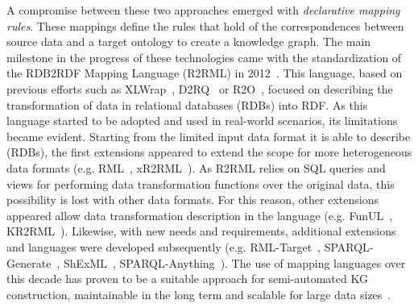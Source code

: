 A compromise between these two approaches emerged with \textit{declarative mapping rules}. 
These mappings define the rules that hold of the correspondences between source data and a target ontology to create a knowledge graph. 
The main milestone in the progress of these technologies came with the standardization of the RDB2RDF Mapping Language (R2RML) in 2012~\parencite{das2012r2rml}. 
This language, based on previous efforts such as XLWrap~\parencite{xlwrap}, D2RQ~\parencite{bizer2004d2rq} or R2O~\parencite{barrasa2004r2o}, focused on describing the transformation of data in relational databases (RDBs) into RDF. 
As this language started to be adopted and used in real-world scenarios, its limitations became evident. 
Starting from the limited input data format it is able to describe (RDBs), the first extensions appeared to extend the scope for more heterogeneous data formats (e.g. RML~\parencite{Dimou2014rml}, xR2RML~\parencite{michel2015xr2rml}). As R2RML relies on SQL queries and views for performing data transformation functions over the original data, this possibility is lost with other data formats. For this reason, other extensions appeared allow data transformation description in the language (e.g. FunUL~\parencite{junior2016funul}, KR2RML~\parencite{slepicka2015kr2rml}). Likewise, with new needs and requirements, additional extensions and languages were developed subsequently (e.g. RML-Target~\parencite{VanAssche2021LeveragingWebThings}, 
SPARQL-Generate~\parencite{Lefrancois2017sparqlgenerate}, 
ShExML~\parencite{Garcia-Gonzalez2020shexml}, 
SPARQL-Anything~\parencite{asprino2023sparql-anything}).
The use of mapping languages over this decade has proven to be a suitable approach for semi-automated KG construction, maintainable in the long term and scalable for large data sizes~\parencite{vidal2023knowledge,iglesias2023scaling,xiao2020virtual,iglesias2022empowering}.  

